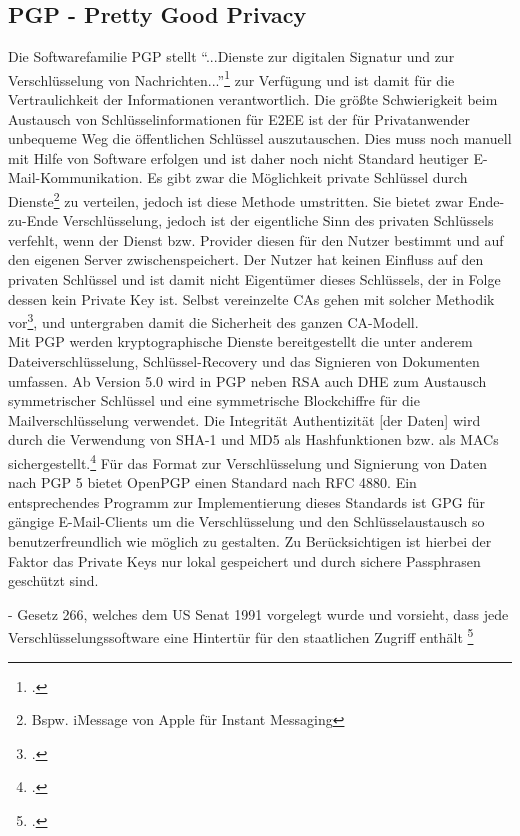 \documentclass  [paper=a4,
				fontsize=12pt,
				listof=totoc,
				bibliography=totoc
				]{scrreprt}
\begin{document}
			\subsection{PGP - Pretty Good Privacy}
			\label{subsec:pgp}
				Die Softwarefamilie \acl{PGP} stellt ``...Dienste zur digitalen Signatur und zur Verschlüsselung von Nachrichten...''\footcite{Mueller2011} zur Verfügung und ist damit für die Vertraulichkeit der Informationen verantwortlich.
				Die größte Schwierigkeit beim Austausch von Schlüsselinformationen für \ac{E2EE} ist der für Privatanwender unbequeme Weg die öffentlichen Schlüssel auszutauschen. Dies muss noch manuell mit Hilfe von Software erfolgen und ist daher noch nicht Standard heutiger E-Mail-Kommunikation. 
				Es gibt zwar die Möglichkeit private Schlüssel durch Dienste\footnote{Bspw. iMessage von Apple für Instant Messaging} zu verteilen, jedoch ist diese Methode umstritten. Sie bietet zwar Ende-zu-Ende Verschlüsselung, jedoch ist der eigentliche Sinn des privaten Schlüssels verfehlt, wenn der Dienst bzw. Provider diesen für den Nutzer bestimmt und auf den eigenen Server zwischenspeichert. Der Nutzer hat keinen Einfluss auf den privaten Schlüssel und ist damit nicht Eigentümer dieses Schlüssels, der in Folge dessen kein Private Key ist. 
				Selbst vereinzelte \ac{CA}s gehen mit solcher Methodik vor\footcite{Kaps2014}, und untergraben damit die Sicherheit des ganzen \ac{CA}-Modell. \medskip\\
				Mit PGP werden kryptographische Dienste bereitgestellt die unter anderem Dateiverschlüsselung, Schlüssel-Recovery und das Signieren von Dokumenten umfassen.
				Ab Version 5.0 wird in PGP neben \ac{RSA} auch \ac{DHE} zum Austausch symmetrischer Schlüssel und eine symmetrische Blockchiffre für die Mailverschlüsselung verwendet. Die Integrität \glqq Authentizität [der Daten] wird durch die Verwendung von \ac{SHA}-1 und \ac{MD5} als Hashfunktionen bzw. als \ac{MAC}s sichergestellt.\grqq\footcite[S.823]{Eckert2013}\medskip
				Für das Format zur Verschlüsselung und Signierung von Daten nach \ac{PGP} 5 bietet OpenPGP einen Standard nach \acs{RFC} 4880. Ein entsprechendes Programm zur Implementierung dieses Standards ist \ac{GPG} für gängige E-Mail-Clients um die Verschlüsselung und den Schlüsselaustausch so benutzerfreundlich wie möglich zu gestalten. Zu Berücksichtigen ist hierbei der Faktor das Private Keys nur lokal gespeichert und durch sichere Passphrasen geschützt sind.
				
				
				- Gesetz 266, welches dem US Senat 1991 vorgelegt wurde und vorsieht, dass jede Verschlüsselungssoftware eine Hintertür für den staatlichen Zugriff enthält
				\footcite[][S. 29]{Schwenk}
				
\end{document}

